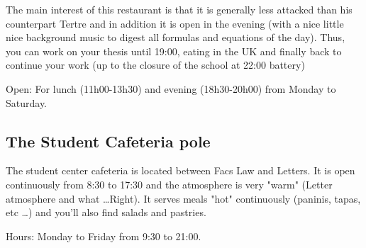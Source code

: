 

The main interest of this restaurant is that it is generally less attacked than his counterpart Tertre and in addition it is open in the evening (with a nice little nice background music to digest all formulas and equations of the day).
Thus, you can work on your thesis until 19:00, eating in the UK and finally back to continue your work (up to the closure of the school at 22:00 battery)

Open: For lunch (11h00-13h30) and evening (18h30-20h00) from Monday to Saturday.


\subsection {The Student Cafeteria pole}


The student center cafeteria is located between Facs Law and Letters.
It is open continuously from 8:30 to 17:30 and the atmosphere is very "warm" (Letter atmosphere and what \dots Right).
It serves meals "hot" continuously (paninis, tapas, etc \dots) and you'll also find salads and pastries.

Hours: Monday to Friday from 9:30 to 21:00.


